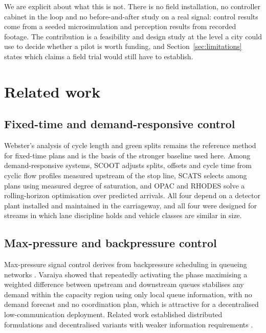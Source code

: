 \documentclass[journal]{IEEEtran}
\begin{document}
We are explicit about what this is not. There is no field installation, no controller cabinet in the
loop and no before-and-after study on a real signal: control results come from a seeded
microsimulation and perception results from recorded footage. The contribution is a feasibility and
design study at the level a city could use to decide whether a pilot is worth funding, and
Section~\ref{sec:limitations} states which claims a field trial would still have to establish.

\section{Related work}

\subsection{Fixed-time and demand-responsive control}

Webster's analysis of cycle length and green splits \cite{Webster1958TrafficSignalSettings} remains
the reference method for fixed-time plans and is the basis of the stronger baseline used here. Among
demand-responsive systems, SCOOT adjusts splits, offsets and cycle time from cyclic flow profiles
measured upstream of the stop line, SCATS selects among plans using measured degree of saturation, and
OPAC and RHODES solve a rolling-horizon optimisation over predicted arrivals. All four depend on a
detector plant installed and maintained in the carriageway, and all four were designed for streams in
which lane discipline holds and vehicle classes are similar in size.

\subsection{Max-pressure and backpressure control}

Max-pressure signal control derives from backpressure scheduling in queueing networks
\cite{Tassiulas1992Stability}. Varaiya
\cite{Varaiya2013MaxPressure,Varaiya2013MaxPressureChapter} showed that repeatedly activating the
phase maximising a weighted difference between upstream and downstream queues stabilises any demand
within the capacity region using only local queue information, with no demand forecast and no
coordination plan, which is attractive for a decentralised low-communication deployment. Related
work established distributed formulations \cite{Wongpiromsarn2012Distributed} and decentralised
variants with weaker information requirements \cite{Le2015Decentralized}.
\end{document}
